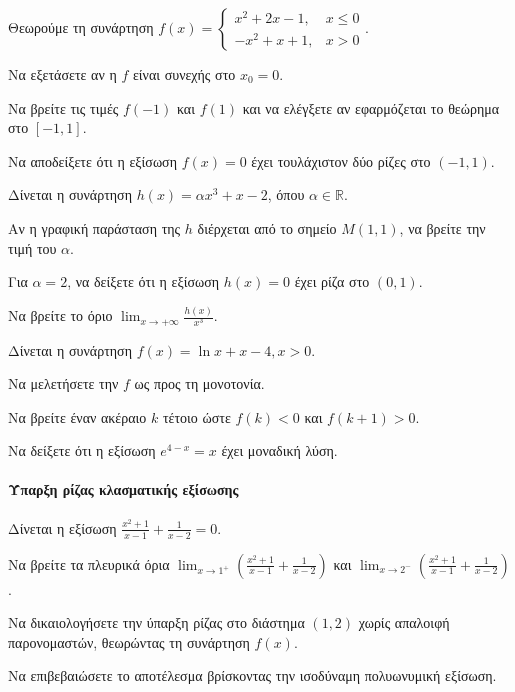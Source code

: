 \documentclass[11pt,a4paper,modern]{FFExercises}
\begin{document}
\askhsh
\askhsh
Θεωρούμε τη συνάρτηση $f(x) = \begin{cases} x^2+2x-1, & x \le 0 \\ -x^2+x+1, & x > 0 \end{cases}$.
\begin{alist}
    \item Να εξετάσετε αν η $f$ είναι συνεχής στο $x_0=0$.
    \item Να βρείτε τις τιμές $f(-1)$ και $f(1)$ και να ελέγξετε αν εφαρμόζεται το θεώρημα  στο $[-1,1]$.
    \item Να αποδείξετε ότι η εξίσωση $f(x)=0$ έχει τουλάχιστον δύο ρίζες στο $(-1,1)$.
\end{alist}

\askhsh
\askhsh
Δίνεται η συνάρτηση $h(x) = \alpha x^3 + x - 2$, όπου $\alpha \in \mathbb{R}$.
\begin{alist}
    \item Αν η γραφική παράσταση της $h$ διέρχεται από το σημείο $M(1, 1)$, να βρείτε την τιμή του $\alpha$.
    \item Για $\alpha=2$, να δείξετε ότι η εξίσωση $h(x)=0$ έχει ρίζα στο $(0,1)$.
    \item Να βρείτε το όριο $\lim_{x\to +\infty} \frac{h(x)}{x^3}$.
\end{alist}

\askhsh
\askhsh
Δίνεται η συνάρτηση $f(x) = \ln x + x - 4, x>0$.
\begin{alist}
    \item Να μελετήσετε την $f$ ως προς τη μονοτονία.
    \item Να βρείτε έναν ακέραιο $k$ τέτοιο ώστε $f(k)<0$ και $f(k+1)>0$.
    \item Να δείξετε ότι η εξίσωση $e^{4-x} = x$ έχει μοναδική λύση.
\end{alist}
\paragraph{Ύπαρξη ρίζας κλασματικής εξίσωσης}
\askhsh
Δίνεται η εξίσωση $\frac{x^2+1}{x-1} + \frac{1}{x-2} = 0$.
\begin{alist}
    \item Να βρείτε τα πλευρικά όρια $\lim_{x\to 1^+} \left(\frac{x^2+1}{x-1} + \frac{1}{x-2}\right)$ και $\lim_{x\to 2^-} \left(\frac{x^2+1}{x-1} + \frac{1}{x-2}\right)$.
    \item Να δικαιολογήσετε την ύπαρξη ρίζας στο διάστημα $(1,2)$ χωρίς απαλοιφή παρονομαστών, θεωρώντας τη συνάρτηση $f(x)$.
    \item Να επιβεβαιώσετε το αποτέλεσμα βρίσκοντας την ισοδύναμη πολυωνυμική εξίσωση.
\end{alist}
\end{document}
